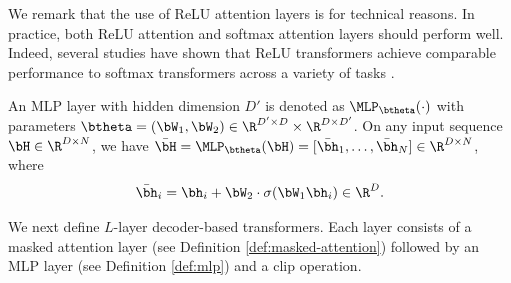 \documentclass[10pt]{article}
\begin{document}
We remark that the use of ReLU attention layers is for technical reasons. In practice, both ReLU attention and softmax attention layers should perform well. Indeed, several studies have shown that ReLU transformers achieve comparable performance to softmax transformers  across a variety of tasks \citep{wortsman2023replacing, shen2023study, bai2023transformers}.

\begin{definition}
\label{def:mlp}
An MLP layer with hidden dimension $D'$ is denoted as $\MLP_{\btheta}(\cdot)$ with parameters $\btheta=(\bW_1,\bW_2)\in\R^{D'\times D}\times\R^{D\times D'}$. On any input sequence $\bH\in\R^{D\times N}$, we have $\bar{\bH} = \MLP_{\btheta}(\bH) = [\bar{\bh}_1, \ldots, \bar{\bh}_N] \in \R^{D \times N}$, where
\[
\bar{\bh}_i=\bh_i+\bW_2 \cdot \sigma(\bW_1\bh_i) \in \R^D.
\]
\end{definition}
We next define $L$-layer decoder-based transformers. Each layer consists of a masked attention layer (see Definition \ref{def:masked-attention}) followed by an MLP layer (see Definition \ref{def:mlp}) and a clip operation. 


\end{document}
